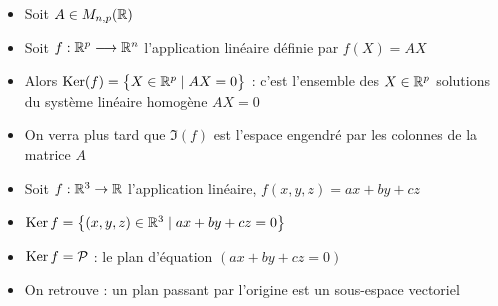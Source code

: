 \begin{frame}

\begin{exemple}
\begin{itemize}
  \item Soit $A \in M_{n,p}(\mathbb{R})$
  \pause
  \item Soit $f: \mathbb{R}^p \longrightarrow \mathbb{R}^n$ l'application linéaire définie par $f(X) = AX$
  \pause
  \item Alors $\mathop{\text{Ker}}\nolimits(f) = \big\{ X \in \mathbb{R}^p \mid AX=0 \big\}$ : c'est l'ensemble des $X \in \mathbb{R}^p$
solutions du système linéaire homogène $AX=0$
  \pause
  \item On verra plus tard que $\Im(f)$ est l'espace engendré 
par les colonnes de la matrice $A$
\end{itemize}
\end{exemple}

\bigskip
\pause

\begin{exemple}
\begin{itemize}
  \item Soit $f : \mathbb{R}^3 \to \mathbb{R}$ l'application linéaire, $f(x,y,z)=ax+by+cz$
  \pause
  \item $\mathop{\text{Ker}}\nolimits f = \big\{ (x,y,z) \in \mathbb{R}^3 \mid ax+by+cz=0 \big\}$
  \pause
  \item $\mathop{\text{Ker}}\nolimits f = \mathcal{P}$ : le plan d'équation $(ax+by+cz=0)$
  \pause
  \item On retrouve : un plan passant par l'origine est un sous-espace vectoriel
\end{itemize}
\end{exemple}

\end{frame}




